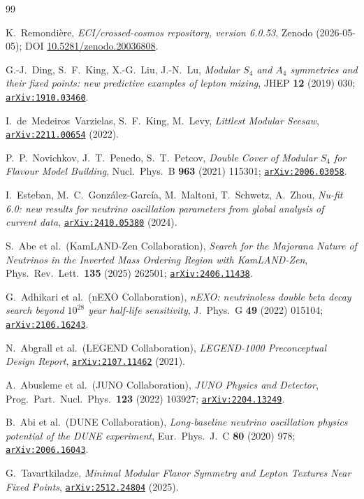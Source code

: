 \documentclass[aps,prl,twocolumn,showpacs,superscriptaddress]{revtex4-2}
\newcommand{\arXiv}[1]{\href{https://arxiv.org/abs/#1}{\texttt{arXiv:#1}}}
\begin{document}
\begin{thebibliography}{99}

K.~Remondi\`ere,
\emph{ECI/crossed-cosmos repository, version 6.0.53},
Zenodo (2026-05-05);
DOI \href{https://doi.org/10.5281/zenodo.20036808}{10.5281/zenodo.20036808}.

G.-J.~Ding, S.~F.~King, X.-G.~Liu, J.-N.~Lu,
\emph{Modular $S_4$ and $A_4$ symmetries and their fixed points:
new predictive examples of lepton mixing},
JHEP \textbf{12} (2019) 030;
\arXiv{1910.03460}.

I.~de~Medeiros~Varzielas, S.~F.~King, M.~Levy,
\emph{Littlest Modular Seesaw},
\arXiv{2211.00654} (2022).

P.~P.~Novichkov, J.~T.~Penedo, S.~T.~Petcov,
\emph{Double Cover of Modular $S_4$ for Flavour Model Building},
Nucl.~Phys.~B \textbf{963} (2021) 115301;
\arXiv{2006.03058}.

I.~Esteban, M.~C.~Gonz\'alez-Garc\'ia, M.~Maltoni,
T.~Schwetz, A.~Zhou,
\emph{Nu-fit 6.0: new results for neutrino oscillation parameters
from global analysis of current data},
\arXiv{2410.05380} (2024).

S.~Abe et al.\ (KamLAND-Zen Collaboration),
\emph{Search for the Majorana Nature of Neutrinos in the Inverted
Mass Ordering Region with KamLAND-Zen},
Phys.~Rev.~Lett.\ \textbf{135} (2025) 262501;
\arXiv{2406.11438}.

G.~Adhikari et al.\ (nEXO Collaboration),
\emph{nEXO: neutrinoless double beta decay search beyond
$10^{28}$ year half-life sensitivity},
J.~Phys.~G \textbf{49} (2022) 015104;
\arXiv{2106.16243}.

N.~Abgrall et al.\ (LEGEND Collaboration),
\emph{LEGEND-1000 Preconceptual Design Report},
\arXiv{2107.11462} (2021).

A.~Abusleme et al.\ (JUNO Collaboration),
\emph{JUNO Physics and Detector},
Prog.\ Part.\ Nucl.\ Phys.\ \textbf{123} (2022) 103927;
\arXiv{2204.13249}.

B.~Abi et al.\ (DUNE Collaboration),
\emph{Long-baseline neutrino oscillation physics potential of the
DUNE experiment},
Eur.~Phys.~J.~C \textbf{80} (2020) 978;
\arXiv{2006.16043}.

G.~Tavartkiladze,
\emph{Minimal Modular Flavor Symmetry and Lepton Textures Near Fixed Points},
\arXiv{2512.24804} (2025).

\end{thebibliography}
\end{document}
